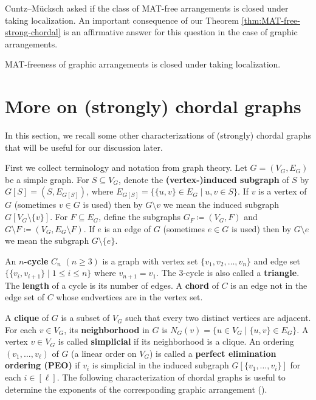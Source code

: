 \documentclass[ALCO, Unicode,published]{cedram}
\begin{document}
Cuntz--M{\"u}cksch  \cite[Problem 48]{CM20} asked if the class of MAT-free arrangements is closed under taking localization.  
 An important consequence of our Theorem \ref{thm:MAT-free-strong-chordal} is an affirmative answer for this question in the case of graphic arrangements.
 \begin{corollary}
 \label{cor:close-localization}
MAT-freeness of graphic arrangements is closed under taking localization.  
\end{corollary}


\section{More on (strongly) chordal graphs}
\label{sec:more}
 \quad
In this section, we recall some other characterizations of (strongly) chordal graphs that will be useful for our discussion later.

First we collect terminology and notation from graph theory. 
Let $ G = (V_{G}, E_{G}) $ be a simple graph. 
For $S \subseteq V_{G}$, denote  the \textbf{(vertex-)induced subgraph} of $S$ by $G[S] = (S, E_{G[S]})$, where $E_{G[S]} =\{ \{u,v\} \in E_G \mid u, v \in S\}$.
If $v$ is a vertex of $G$ (sometimes $v \in G$ is used) then by $G\setminus  v$ we mean the induced subgraph $G[V_G\setminus\{v\}]$. 
For $ F \subseteq E_{G} $, define the subgraphs $ G_{F} \coloneqq (V_{G}, F) $ and $ G\setminus F \coloneqq (V_{G}, E_{G} \setminus F) $.
If $e$ is an edge of $G$ (sometimes $e \in G$ is used) then by $G\setminus e$ we mean the subgraph $G \setminus \{e\} $. 

An \textbf{$n$-cycle} $C_{n}$ $(n\ge3)$ is a graph with vertex set $\{v_1, v_2, \ldots, v_n\}$ and edge set~$\{\{v_i, v_{i+1}\} \mid 1 \le i\le n\}$ where $v_{n+1}=v_1$. 
The $3$-cycle is also called a \textbf{triangle}.
The  \textbf{length}  of a cycle is its number of edges. 
A \textbf{chord} of $C$ is an edge not in the edge set of $C$ whose endvertices are in the vertex set.

A \textbf{clique} of $G$ is a subset of $V_{G}$ such that every two distinct vertices are adjacent. 
For each $v \in V_{G}$, its  \textbf{neighborhood} in $G$ is $ N_{G}(v) =\{ u \in V_{G} \mid \{u,v\} \in E_G\}$. 
A vertex $ v \in V_{G} $ is called \textbf{simplicial} if  its neighborhood is a clique. 
An ordering~$ (v_{1}, \dots, v_{\ell}) $ of $ G $ (a linear order on $ V_{G} $) is called a \textbf{perfect elimination ordering (PEO)}   if $ v_{i} $ is simplicial in the induced subgraph $ G[\{v_{1}, \dots, v_{i}\}] $ for each $ i \in [\ell] $. 
The following characterization of chordal graphs is useful to determine the exponents of the corresponding graphic arrangement (\eg  \cite[Lemma 3.4]{ER94}).
\end{document}
